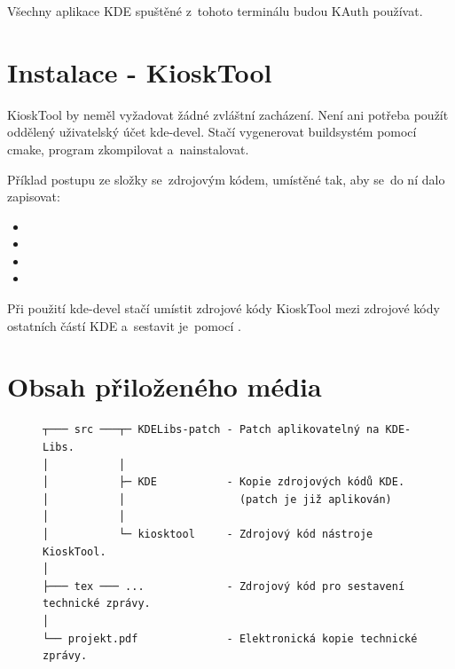 Všechny aplikace KDE spuštěné z~tohoto terminálu budou KAuth používat.

\section*{Instalace - KioskTool}
KioskTool by neměl vyžadovat žádné zvláštní zacházení. Není ani potřeba použít oddělený uživatelský účet kde-devel. Stačí vygenerovat buildsystém pomocí cmake, program zkompilovat a~nainstalovat.

Příklad postupu ze složky se~zdrojovým kódem, umístěné tak, aby se~do ní dalo zapisovat:
\begin{itemize}
\item {}
\item {}
\item {}
\item {}
\end{itemize}
Při použití kde-devel stačí umístit zdrojové kódy KioskTool mezi zdrojové kódy ostatních částí KDE a~sestavit je~pomocí .

\section*{Obsah přiloženého média}
\begin{figure}[h!]
    \centering
    \begin{verbatim}
┬─── src ───┬─ KDELibs-patch - Patch aplikovatelný na KDE-Libs.
│           │
│           ├─ KDE           - Kopie zdrojových kódů KDE.
│           │                  (patch je již aplikován)
│           │
│           └─ kiosktool     - Zdrojový kód nástroje KioskTool.
│
├─── tex ─── ...             - Zdrojový kód pro sestavení technické zprávy.
│
└── projekt.pdf              - Elektronická kopie technické zprávy.
\end{verbatim}
\end{figure}

